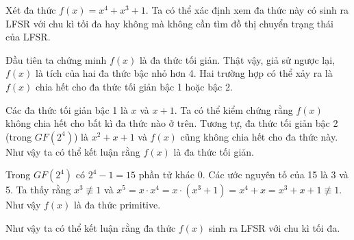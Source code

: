 \begin{example}
	Xét đa thức $f(x) = x^4 + x^3 + 1$. Ta có thể xác định xem đa thức này có sinh ra LFSR với chu kì tối đa hay không mà không cần tìm đồ thị chuyển trạng thái của LFSR.
	
	Đầu tiên ta chứng minh $f(x)$ là đa thức tối giản. Thật vậy, giả sử ngược lại, $f(x)$ là tích của hai đa thức bậc nhỏ hơn 4. Hai trường hợp có thể xảy ra là $f(x)$ chia hết cho đa thức tối giản bậc 1 hoặc bậc 2.
	
	Các đa thức tối giản bậc 1 là $x$ và $x+1$. Ta có thể kiểm chứng rằng $f(x)$ không chia hết cho bất kì đa thức nào ở trên. Tương tự, đa thức tối giản bậc 2 (trong $GF(2^4)$) là $x^2 + x + 1$ và $f(x)$ cũng không chia hết cho đa thức này. Như vậy ta có thể kết luận rằng $f(x)$ là đa thức tối giản.
	
	Trong $GF(2^4)$ có $2^4 - 1 = 15$ phần tử khác 0. Các ước nguyên tố của 15 là 3 và 5. Ta thấy rằng $x^3 \not\equiv 1$ và $x^5 = x \cdot x^4 = x \cdot (x^3 + 1) = x^4 + x = x^3 + x + 1 \not\equiv 1$. Như vậy $f(x)$ là đa thức primitive.
	
	Như vậy ta có thể kết luận rằng đa thức $f(x)$ sinh ra LFSR với chu kì tối đa.
\end{example}

